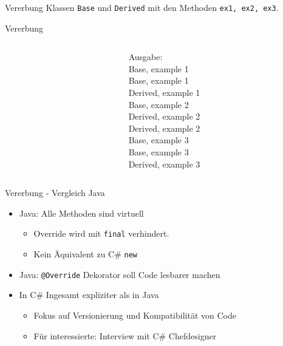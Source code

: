 \documentclass[11pt]{beamer}
\begin{document}
\begin{frame}{Vererbung}
	Klassen \texttt{Base} und \texttt{Derived} mit den Methoden \texttt{ex1, ex2, ex3}.
\end{frame}

\begin{frame}{Vererbung}
	\begin{columns}
		\begin{column}{0.7\textwidth}
		\end{column}
		\begin{column}{0.3\textwidth}
		Ausgabe: \medskip\\
Base, example 1\\
Base, example 1\\
Derived, example 1 \medskip\\
Base, example 2\\
Derived, example 2\\
Derived, example 2\medskip\\
Base, example 3\\
Base, example 3\\
Derived, example 3			
		\end{column}
	\end{columns}
\end{frame}

\begin{frame}{Vererbung - Vergleich Java}
	
	\begin{itemize}
		\item Java: Alle Methoden sind virtuell
		\begin{itemize}
			\item Override wird mit \texttt{final} verhindert.
			\item Kein Äquivalent zu C\# \texttt{new}
		\end{itemize}
		\item Java: \texttt{@Override} Dekorator soll Code lesbarer machen
		\item In C\# Ingesamt expliziter als in Java
		\begin{itemize}
			\item Fokus auf Versionierung und Kompatibilität von Code
			\item Für interessierte: Interview mit C\# Chefdesigner \cite{interview_virtual}
		\end{itemize}
	\end{itemize}

\end{frame}
\end{document}
